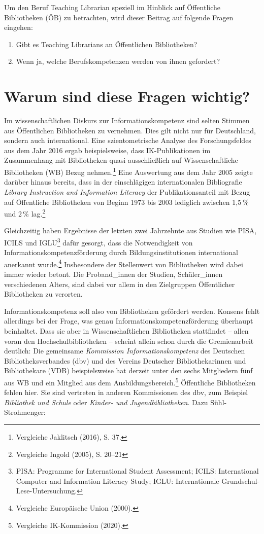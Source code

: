 \documentclass[a4paper,
fontsize=11pt,
oneside,
numbers=noperiodatend,
parskip=half-,
bibliography=totoc,
final
]{scrartcl}
\begin{document}
Um den Beruf Teaching Librarian speziell im Hinblick auf Öffentliche
Bibliotheken (ÖB) zu betrachten, wird dieser Beitrag auf folgende Fragen
eingehen:

\begin{enumerate}
\def\labelenumi{\arabic{enumi}.}
\item
  Gibt es Teaching Librarians an Öffentlichen Bibliotheken?
\item
  Wenn ja, welche Berufskompetenzen werden von ihnen gefordert?
\end{enumerate}

\hypertarget{warum-sind-diese-fragen-wichtig}{%
\section{Warum sind diese Fragen
wichtig?}\label{warum-sind-diese-fragen-wichtig}}

Im wissenschaftlichen Diskurs zur Informationskompetenz sind selten
Stimmen aus Öffentlichen Bibliotheken zu vernehmen. Dies gilt nicht nur
für Deutschland, sondern auch international. Eine szientometrische
Analyse des Forschungsfeldes aus dem Jahr 2016 ergab beispielsweise,
dass IK-Publikationen im Zusammenhang mit Bibliotheken quasi
ausschließlich auf Wissenschaftliche Bibliotheken (WB) Bezug
nehmen.\footnote{Vergleiche Jaklitsch (2016), S. 37.} Eine Auswertung
aus dem Jahr 2005 zeigte darüber hinaus bereits, dass in der
einschlägigen internationalen Bibliografie \emph{Library Instruction and
Information Literacy} der Publikationsanteil mit Bezug auf Öffentliche
Bibliotheken von Beginn 1973 bis 2003 lediglich zwischen 1,5 \% und
2\,\% lag.\footnote{Vergleiche Ingold (2005), S. 20--21}

Gleichzeitig haben Ergebnisse der letzten zwei Jahrzehnte aus Studien
wie PISA, ICILS und IGLU\footnote{PISA: Programme for International
  Student Assessment; ICILS: International Computer and Information
  Literacy Study; IGLU: Internationale Grundschul-Lese-Untersuchung.}
dafür gesorgt, dass die Notwendigkeit von Informationskompetenzförderung
durch Bildungsinstitutionen international anerkannt wurde.\footnote{Vergleiche
  Europäische Union (2000).} Insbesondere der Stellenwert von
Bibliotheken wird dabei immer wieder betont. Die Proband\_innen der
Studien, Schüler\_innen verschiedenen Alters, sind dabei vor allem in
den Zielgruppen Öffentlicher Bibliotheken zu verorten.

Informationskompetenz soll also von Bibliotheken gefördert werden.
Konsens fehlt allerdings bei der Frage, was genau
Informationskompetenzförderung überhaupt beinhaltet. Dass sie aber in
Wissenschaftlichen Bibliotheken stattfindet -- allen voran den
Hochschulbibliotheken -- scheint allein schon durch die Gremienarbeit
deutlich: Die gemeinsame \emph{Kommission Informationskompetenz} des
Deutschen Bibliotheksverbandes (dbv) und des Vereins Deutscher
Bibliothekarinnen und Bibliothekare (VDB) beispielsweise hat derzeit
unter den sechs Mitgliedern fünf aus WB und ein Mitglied aus dem
Ausbildungsbereich.\footnote{Vergleiche IK-Kommission (2020).}
Öffentliche Bibliotheken fehlen hier. Sie sind vertreten in anderen
Kommissionen des dbv, zum Beispiel \emph{Bibliothek und Schule} oder
\emph{Kinder- und Jugendbibliotheken}. Dazu Sühl-Strohmenger:
\end{document}
